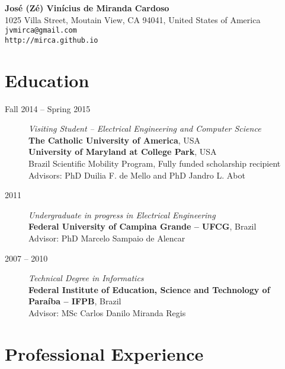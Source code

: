 \documentclass[10pt]{article}
\begin{document}
\pagestyle{empty}
\begin{titlepage}
 \begin{center}
     {\Large{\textbf{Jos\'e (Z\'e) Vin\'icius de Miranda Cardoso}}}\\
  1025 Villa Street, Moutain View, CA 94041, United States of America \\
  \texttt{jvmirca@gmail.com}\\ \texttt{http://mirca.github.io} \\
 \end{center}

\section{Education}

\begin{description}
 \item[Fall 2014 -- Spring 2015] \emph{Visiting Student -- Electrical Engineering and Computer Science} \\\textbf{The Catholic University of America}, USA\\
\textbf{University of Maryland at College Park}, USA \\ Brazil Scientific Mobility
 Program, Fully funded scholarship recipient \\ Advisors: PhD Duilia F. de Mello and PhD Jandro L. Abot
 \item[2011] \emph{Undergraduate in progress in Electrical Engineering} \\\textbf{Federal University of Campina Grande -- UFCG}, Brazil\\ Advisor: PhD Marcelo Sampaio de Alencar
 \item[2007 -- 2010] \emph{Technical Degree in Informatics} \\ \textbf{Federal Institute of Education, Science and Technology of Para\'iba -- IFPB}, Brazil \\ Advisor: MSc Carlos Danilo Miranda Regis
\end{description}

\section{Professional Experience}


\end{titlepage}
\end{document}
